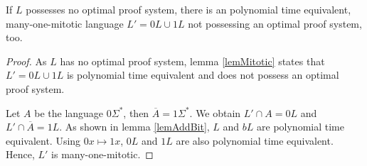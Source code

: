  \begin{theorem}
    If \(L\) possesses no optimal proof system, there is an polynomial time equivalent, many-one-mitotic language \(L' = 0L \cup 1L\) not possessing an optimal proof system, too.
  \end{theorem}

  \begin{proof}
    As \(L\) has no optimal proof system, lemma \ref{lemMitotic} states that \(L' = 0L \cup 1L\) is polynomial time equivalent and does not possess an optimal proof system.

    Let \(A\) be the language \(0\Sigma^*\), then \(\overline{A} = 1\Sigma^*\). We obtain \(L' \cap A = 0L\) and \(L' \cap \overline{A} = 1L\). As shown in lemma \ref{lemAddBit}, \(L\) and \(bL\) are polynomial time equivalent. Using \(0x \mapsto 1x\), \(0L\) and \(1L\) are also polynomial time equivalent. Hence, \(L'\) is many-one-mitotic.
  \end{proof}



  